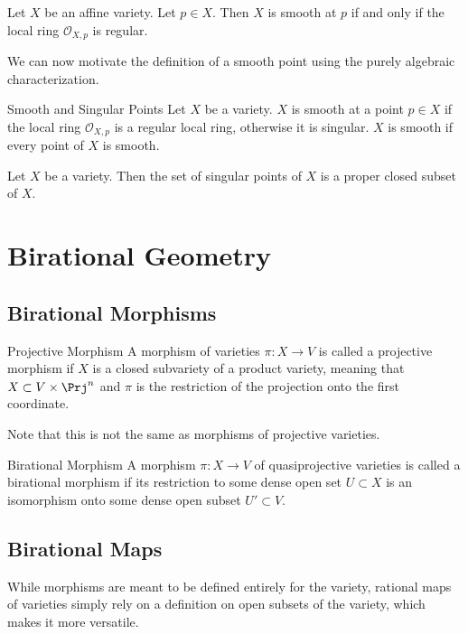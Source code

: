 \documentclass[a4paper]{article}
\begin{document}
\begin{prp}{}{} Let $X$ be an affine variety. Let $p\in X$. Then $X$ is smooth at $p$ if and only if the local ring $\mathcal{O}_{X,p}$ is regular. 
\end{prp}

We can now motivate the definition of a smooth point using the purely algebraic characterization. 

\begin{defn}{Smooth and Singular Points}{} Let $X$ be a variety. $X$ is smooth at a point $p\in X$ if the local ring $\mathcal{O}_{X,p}$ is a regular local ring, otherwise it is singular. $X$ is smooth if every point of $X$ is smooth. 
\end{defn}

\begin{thm}{}{} Let $X$ be a variety. Then the set of singular points of $X$ is a proper closed subset of $X$. 
\end{thm}

\pagebreak
\section{Birational Geometry}
\subsection{Birational Morphisms}
\begin{defn}{Projective Morphism}{} A morphism of varieties $\pi:X\to V$ is called a projective morphism if $X$ is a closed subvariety of a product variety, meaning that $X\subset V\times\Prj^n$ and $\pi$ is the restriction of the projection onto the first coordinate. 
\end{defn}

Note that this is not the same as morphisms of projective varieties. 

\begin{defn}{Birational Morphism}{} A morphism $\pi:X\to V$ of quasiprojective varieties is called a birational morphism if its restriction to some dense open set $U\subset X$ is an isomorphism onto some dense open subset $U'\subset V$. 
\end{defn}

\subsection{Birational Maps}
While morphisms are meant to be defined entirely for the variety, rational maps of varieties simply rely on a definition on open subsets of the variety, which makes it more versatile. 
\end{document}

